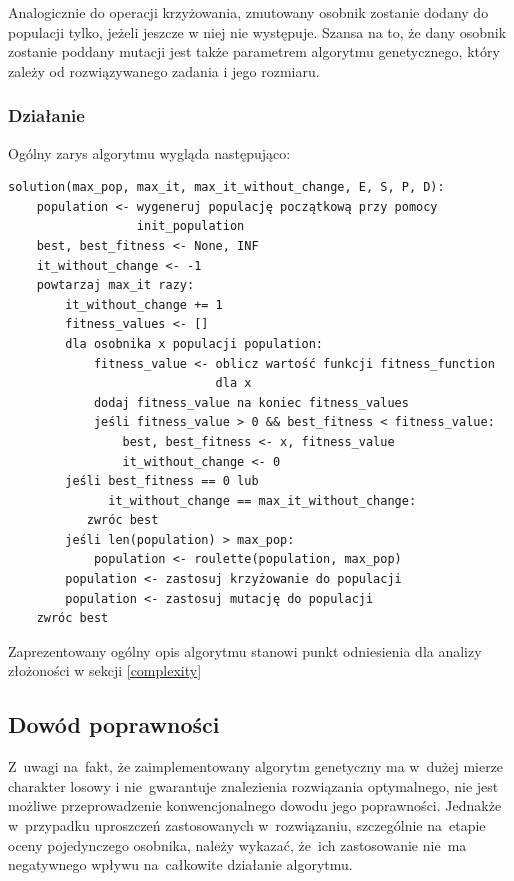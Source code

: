 \documentclass[12pt,a4paper]{article}
\theoremstyle{definition}
\begin{document}
\vspace{0.5em}
\noindent
 Analogicznie do operacji krzyżowania, zmutowany osobnik zostanie dodany do populacji tylko, jeżeli jeszcze w niej nie występuje. Szansa na to, że dany osobnik zostanie poddany mutacji jest także parametrem algorytmu genetycznego, który zależy od rozwiązywanego zadania i jego rozmiaru.

\subsubsection{Działanie}
Ogólny zarys algorytmu wygląda następująco:
\begin{tcolorbox}[title=Pseudokod algorytmu]
\begin{verbatim}
solution(max_pop, max_it, max_it_without_change, E, S, P, D):
    population <- wygeneruj populację początkową przy pomocy 
                  init_population
    best, best_fitness <- None, INF
    it_without_change <- -1
    powtarzaj max_it razy:
        it_without_change += 1
        fitness_values <- []
        dla osobnika x populacji population:
            fitness_value <- oblicz wartość funkcji fitness_function 
                             dla x
            dodaj fitness_value na koniec fitness_values
            jeśli fitness_value > 0 && best_fitness < fitness_value:
                best, best_fitness <- x, fitness_value
                it_without_change <- 0
        jeśli best_fitness == 0 lub 
              it_without_change == max_it_without_change:
           zwróc best
        jeśli len(population) > max_pop:
            population <- roulette(population, max_pop)
        population <- zastosuj krzyżowanie do populacji
        population <- zastosuj mutację do populacji
    zwróc best
\end{verbatim}
\end{tcolorbox}
\noindent
Zaprezentowany ogólny opis algorytmu stanowi punkt odniesienia dla analizy złożoności w sekcji \ref{complexity}

\subsection{Dowód poprawności}
\label{subsec:correctnessintervals}
Z~uwagi na~fakt, że zaimplementowany algorytm genetyczny ma w~dużej mierze charakter losowy i nie~gwarantuje znalezienia rozwiązania optymalnego, nie jest możliwe przeprowadzenie konwencjonalnego dowodu jego poprawności.
Jednakże w~przypadku uproszczeń zastosowanych w~rozwiązaniu, szczególnie na~etapie oceny pojedynczego osobnika, należy wykazać, że~ich zastosowanie nie~ma negatywnego wpływu na~całkowite działanie algorytmu.\\
\end{document}
